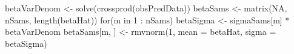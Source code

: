 \begin{Schunk}
\begin{Sinput}
 betaVarDenom <- solve(crossprod(obsPredData))
 betaSams <- matrix(NA, nSams, length(betaHat))
 for(m in 1 : nSams) {
   betaSigma <- sigmaSams[m] * betaVarDenom
   betaSams[m, ] <- 
     rmvnorm(1, mean = betaHat, sigma = betaSigma)
 }
\end{Sinput}
\end{Schunk}
